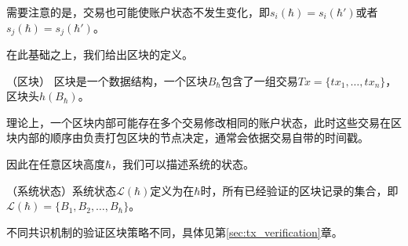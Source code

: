 需要注意的是，交易也可能使账户状态不发生变化，即$s_i(\hbar)=s_i(\hbar')$或者$s_j(\hbar)=s_j(\hbar')$。

在此基础之上，我们给出区块的定义。

\begin{definition}
\label{def:block}
（区块） 区块是一个数据结构，一个区块$B_{\hbar}$包含了一组交易$Tx=\{tx_1,\dots,tx_n\}$，区块头$h(B_{\hbar})$。%
\end{definition}

理论上，一个区块内部可能存在多个交易修改相同的账户状态，此时这些交易在区块内部的顺序由负责打包区块的节点决定，通常会依据交易自带的时间戳。

因此在任意区块高度$\hbar$，我们可以描述系统的状态。

\begin{definition}
（系统状态）系统状态$\mathcal{L}(\hbar)$定义为在$\hbar$时，所有已经验证的区块记录的集合，即$\mathcal{L}(\hbar)=\{B_1,B_2,\dots,B_{\hbar}\}$。
\end{definition}

不同共识机制的验证区块策略不同，具体见第\ref{sec:tx_verification}章。


